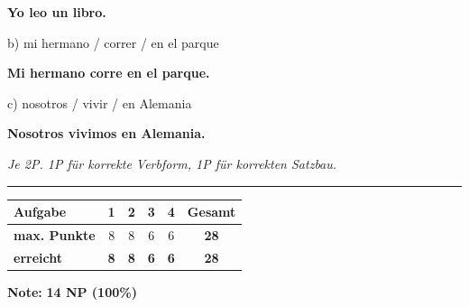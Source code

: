 \documentclass[11pt, a4paper]{article}
\newcommand{\lsg}[1]{\textcolor{loesung}{\textbf{#1}}}
\begin{document}
\lsg{Yo leo un libro.}

\vspace{1em}

\noindent
b) mi hermano / correr / en el parque

\lsg{Mi hermano corre en el parque.}

\vspace{1em}

\noindent
c) nosotros / vivir / en Alemania

\lsg{Nosotros vivimos en Alemania.}

\textit{\textcolor{grau}{Je 2P. 1P für korrekte Verbform, 1P für korrekten Satzbau.}}


\vspace{25pt}
\hrule
\vspace{10pt}

\noindent
\begin{tabularx}{\textwidth}{|X|c|c|c|c||c|}
\hline
\textbf{Aufgabe} & 1 & 2 & 3 & 4 & \textbf{Gesamt} \\
\hline
\textbf{max. Punkte} & 8 & 8 & 6 & 6 & \textbf{28} \\
\hline
\textbf{erreicht} & \lsg{8} & \lsg{8} & \lsg{6} & \lsg{6} & \lsg{28} \\[0.8em]
\hline
\end{tabularx}

\vspace{10pt}

\begin{flushright}
\textbf{Note:} \lsg{14 NP (100\%)}
\end{flushright}
\end{document}
